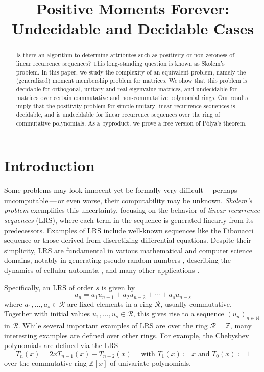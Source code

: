 
\title{Positive Moments Forever:\\ Undecidable and Decidable Cases}
\maketitle

\begin{abstract}
Is there an algorithm to determine attributes such as positivity or non-zeroness of linear recurrence sequences? 
This long-standing question is known as Skolem's problem. 
In this paper, we study the complexity of an equivalent problem, namely the (generalized) moment membership problem for matrices. 
We show that this problem is decidable for orthogonal, unitary and real eigenvalue matrices, 
and undecidable for matrices over certain commutative and non-commutative polynomial rings. 
Our results imply that the positivity problem for simple unitary linear recurrence sequences is decidable, 
and is undecidable for linear recurrence sequences over the  ring of commutative polynomials. 
As a byproduct, we prove a free version of P\'olya's theorem.
\end{abstract}

\tableofcontents

\section{Introduction}
Some problems may look innocent yet be formally very difficult\,---\,perhaps uncomputable\,---\,or even worse, their computability may be unknown. 
\emph{Skolem's problem} exemplifies this uncertainty, focusing on the behavior of \emph{linear recurrence sequences} (LRS), where each term in the sequence is generated linearly from its predecessors. Examples of LRS include well-known sequences like the Fibonacci sequence or those derived from discretizing differential equations. Despite their simplicity, LRS are fundamental in various mathematical and computer science domains, notably in generating pseudo-random numbers \cite{Ta65}, describing the dynamics of cellular automata \cite{Ma84}, and many other applications \cite{Ev03}.

Specifically, an LRS of order $s$ is given by
$$
u_n = a_1 u_{n-1} + a_2 u_{n-2} + \cdots + a_s u_{n-s}
$$
where $a_1, \ldots, a_s \in \mathcal{R}$ are fixed elements in a ring $\mathcal{R}$, usually commutative. Together with initial values $u_1, \ldots, u_s \in \mathcal{R}$, this gives rise to a sequence $(u_n)_{n \in \mathbb{N}}$ in $\mathcal{R}$. While several important examples of LRS are over the ring $\mathcal{R} = \mathbb{Z}$, many interesting examples are defined over other rings. For example, the Chebyshev polynomials are defined via the LRS
$$ T_{n}(x) = 2x T_{n-1}(x) - T_{n-2}(x) \quad \text{ with } T_1(x) \coloneqq x \text{ and } T_0(x) \coloneqq 1$$
over the commutative ring  $\mathbb{Z}[x]$ of univariate polynomials.

